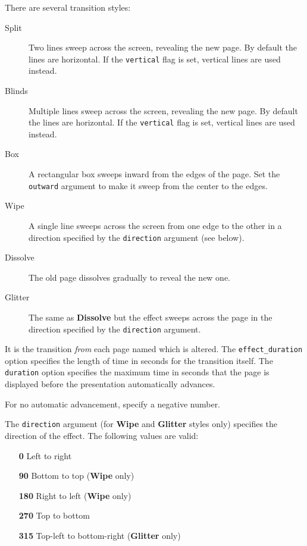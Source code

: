 \documentclass[a4paper]{memoir}
\begin{document}
There are several transition styles:

\begin{description}
  \item[Split]Two lines sweep across the screen, revealing the new page. By
default the lines are horizontal. If the \verb!vertical! flag is set, vertical lines are used instead.
  \item[Blinds]Multiple lines sweep across the screen, revealing the new page.
By default the lines are horizontal. If the \verb!vertical! flag is set, vertical lines are used instead.
  \item[Box]A rectangular box sweeps inward from the edges of the page. Set the
\verb!outward! argument to make it sweep from the center to the edges.
  \item[Wipe]A single line sweeps across the screen from one edge to the other
in a direction specified by the \verb!direction! argument (see below).
  \item[Dissolve]The old page dissolves gradually to reveal the new one.
  \item[Glitter]The same as \textbf{Dissolve} but the effect sweeps across the
page in the direction specified by the \verb!direction! argument.
\end{description}

It is the transition \textit{from} each page named which is altered. The
\verb!effect_duration! option specifies the length of time in seconds for the
transition itself. The \verb!duration! option specifies the maximum time in
seconds that the page is displayed before the presentation automatically
advances.

For no automatic advancement, specify a negative number.

The \texttt{direction} argument (for \textbf{Wipe} and \textbf{Glitter} styles
only) specifies the direction of the effect. The following values are valid:
\begin{framed}
\begin{itemize}
  \item[\textbf{0}] Left to right
  \item[\textbf{90}] Bottom to top (\textbf{Wipe} only)
  \item[\textbf{180}] Right to left (\textbf{Wipe} only)
  \item[\textbf{270}] Top to bottom
  \item[\textbf{315}] Top-left to bottom-right (\textbf{Glitter} only)
\end{itemize}
\end{framed}
\end{document}
